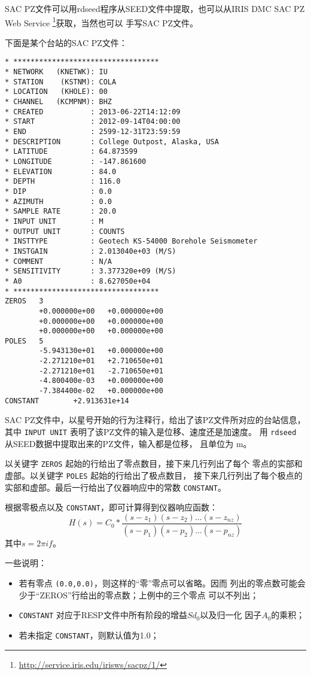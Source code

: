 SAC PZ文件可以用rdseed程序从SEED文件中提取，也可以从IRIS DMC SAC PZ Web Service
\footnote{\url{http://service.iris.edu/irisws/sacpz/1/}}获取，当然也可以
手写SAC PZ文件。

下面是某个台站的SAC PZ文件：
\begin{verbatim}
* **********************************
* NETWORK   (KNETWK): IU
* STATION    (KSTNM): COLA
* LOCATION   (KHOLE): 00
* CHANNEL   (KCMPNM): BHZ
* CREATED           : 2013-06-22T14:12:09
* START             : 2012-09-14T04:00:00
* END               : 2599-12-31T23:59:59
* DESCRIPTION       : College Outpost, Alaska, USA
* LATITUDE          : 64.873599
* LONGITUDE         : -147.861600
* ELEVATION         : 84.0
* DEPTH             : 116.0
* DIP               : 0.0
* AZIMUTH           : 0.0
* SAMPLE RATE       : 20.0
* INPUT UNIT        : M
* OUTPUT UNIT       : COUNTS
* INSTTYPE          : Geotech KS-54000 Borehole Seismometer
* INSTGAIN          : 2.013040e+03 (M/S)
* COMMENT           : N/A
* SENSITIVITY       : 3.377320e+09 (M/S)
* A0                : 8.627050e+04
* **********************************
ZEROS   3
        +0.000000e+00   +0.000000e+00
        +0.000000e+00   +0.000000e+00
        +0.000000e+00   +0.000000e+00
POLES   5
        -5.943130e+01   +0.000000e+00
        -2.271210e+01   +2.710650e+01
        -2.271210e+01   -2.710650e+01
        -4.800400e-03   +0.000000e+00
        -7.384400e-02   +0.000000e+00
CONSTANT        +2.913631e+14
\end{verbatim}

SAC PZ文件中，以星号开始的行为注释行，给出了该PZ文件所对应的台站信息，
其中 \texttt{INPUT UNIT} 表明了该PZ文件的输入是位移、速度还是加速度。
用 \texttt{rdseed} 从SEED数据中提取出来的PZ文件，输入都是位移，
且单位为 \si{\m}。

以关键字 \texttt{ZEROS} 起始的行给出了零点数目，接下来几行列出了每个
零点的实部和虚部。以关键字 \texttt{POLES} 起始的行给出了极点数目，
接下来几行列出了每个极点的实部和虚部。最后一行给出了仪器响应中的常数
\texttt{CONSTANT}。

根据零极点以及 \texttt{CONSTANT}，即可计算得到仪器响应函数：
\[
    H(s) = C_0 * \frac{(s-z_1)(s-z_2)...(s-z_{nz})}{(s-p_1)(s-p_2)...(s-p_{nz})}
\]
其中$s=2\pi i f$。

一些说明：
\begin{itemize}
\item 若有零点 \texttt{(0.0,0.0)}，则这样的``零''零点可以省略。因而
    列出的零点数可能会少于``ZEROS''行给出的零点数；上例中的三个零点
    可以不列出；
\item \texttt{CONSTANT} 对应于RESP文件中所有阶段的增益$Sd_0$以及归一化
    因子$A_0$的乘积；
\item 若未指定 \texttt{CONSTANT}，则默认值为1.0；
\end{itemize}

